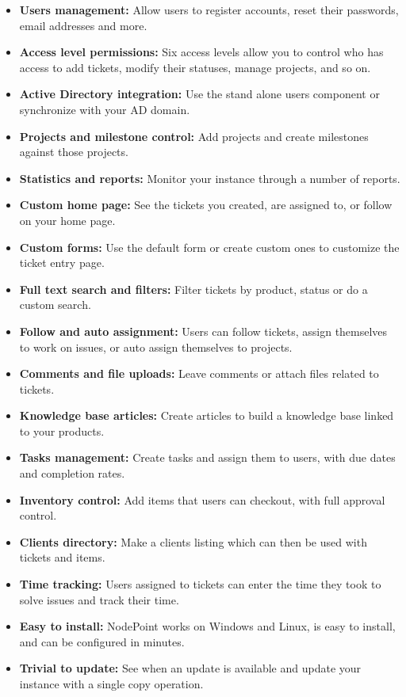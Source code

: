 \documentclass[11pt]{article}
\begin{document}
\begin{itemize}
\item \textbf{Users management:}  Allow users to register accounts, reset their passwords, email addresses and more.
\item \textbf{Access level permissions:} Six access levels allow you to control who has access to add tickets, modify their statuses, manage projects, and so on.
\item \textbf{Active Directory integration:} Use the stand alone users component or synchronize with your AD domain.
\item \textbf{Projects and milestone control:} Add projects and create milestones against those projects.
\item \textbf{Statistics and reports:} Monitor your instance through a number of reports.
\item \textbf{Custom home page:} See the tickets you created, are assigned to, or follow on your home page.
\item \textbf{Custom forms:} Use the default form or create custom ones to customize the ticket entry page.
\item \textbf{Full text search and filters:} Filter tickets by product, status or do a custom search.
\item \textbf{Follow and auto assignment:} Users can follow tickets, assign themselves to work on issues, or auto assign themselves to projects.
\item \textbf{Comments and file uploads:} Leave comments or attach files related to tickets.
\item \textbf{Knowledge base articles:} Create articles to build a knowledge base linked to your products.
\item \textbf{Tasks management:} Create tasks and assign them to users, with due dates and completion rates.
\item \textbf{Inventory control:} Add items that users can checkout, with full approval control.
\item \textbf{Clients directory:} Make a clients listing which can then be used with tickets and items.
\item \textbf{Time tracking:} Users assigned to tickets can enter the time they took to solve issues and track their time.
\item \textbf{Easy to install:} NodePoint works on Windows and Linux, is easy to install, and can be configured in minutes.
\item \textbf{Trivial to update:} See when an update is available and update your instance with a single copy operation.

\end{itemize}
\end{document}
